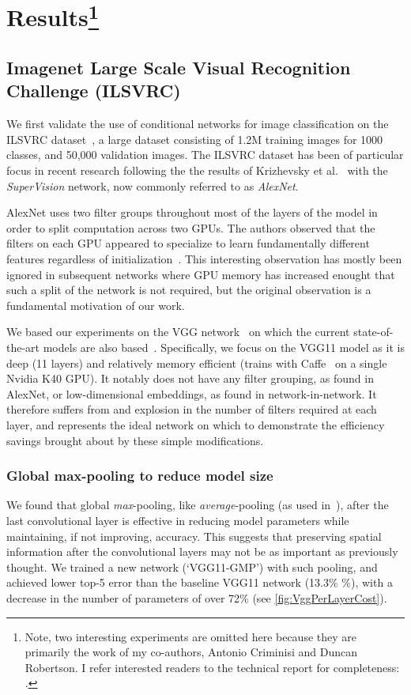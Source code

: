 \documentclass[thesis]{subfiles}
\begin{document}
	\section[Results]{Results\protect\footnote{Note, two interesting experiments are omitted here because they are primarily the work of my co-authors, Antonio Criminisi and Duncan Robertson. I refer interested readers to the technical report for completeness: \citet{Ioannou2015}.}}
	\subsection{Imagenet Large Scale Visual Recognition Challenge (ILSVRC)}
	We first validate the use of conditional networks for image classification on the ILSVRC dataset~\citep{ILSVRC2015}, a large dataset consisting of 1.2M training images for 1000 classes, and 50,000 validation images. The ILSVRC dataset has been of particular focus in recent research following the the results of Krizhevsky et al.~\citep{Krizhevsky2012} with the \emph{SuperVision} network, now commonly referred to as \emph{AlexNet}.
	
	AlexNet uses two filter groups throughout most of the layers of the model in order to split computation across two GPUs. The authors observed that the filters on each GPU appeared to specialize to learn fundamentally different features regardless of initialization~\citep{Krizhevsky2012}. This interesting observation has mostly been ignored in subsequent networks where GPU memory has increased enought that such a split of the network is not required, but the original observation is a fundamental motivation of our work.
	
	We based our experiments on the VGG network~\citep{Simonyan2014verydeep} on which the current state-of-the-art models are also based~\citep{He2015b}. Specifically, we focus on the VGG11 model as it is deep (11 layers) and relatively memory efficient (trains with Caffe~\citep{Jia2014} on a single Nvidia K40 GPU). It notably does not have any filter grouping, as found in AlexNet, or low-dimensional embeddings, as found in network-in-network. It therefore suffers from and explosion in the number of filters required at each layer, and represents the ideal network on which to demonstrate the efficiency savings brought about by these simple modifications.
	
	\subsubsection{Global max-pooling to reduce model size}
	We found that global {\em max}-pooling, like 
	{\em average}-pooling (as used in~\citep{Lin2013NiN,Szegedy2014going}), after the last convolutional layer is effective in reducing model parameters while maintaining, if not improving, accuracy. This suggests that preserving spatial information after the convolutional layers may not be as important as previously thought. 
	We trained a new network (`VGG11-GMP') with such pooling, and achieved lower top-5 error than the baseline VGG11 
	network (13.3\% \%), with a decrease in the number of parameters of over 72\% (see \cref{fig:VggPerLayerCost}).
	
\end{document}
